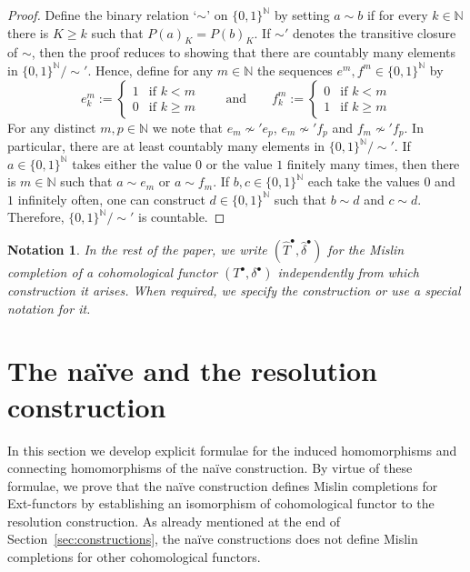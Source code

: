 \documentclass[12pt,a4paper]{article}
\numberwithin{equation}{section}
\newtheorem{notn}[thm]{Notation}
\theoremstyle{nonumberplain}
\newtheorem{proof}{Proof}
\begin{document}
\begin{proof}
Define the binary relation `$\sim$' on $\lbrace 0, 1 \rbrace^{\mathbb{N}}$ by setting $a \sim b$ if for every $k \in \mathbb{N}$ there is $K \geq k$ such that $P(a)_K = P(b)_K$. If $\sim'$ denotes the transitive closure of $\sim$, then the proof reduces to showing that there are countably many elements in $\lbrace 0, 1 \rbrace^{\mathbb{N}}/\sim'$. Hence, define for any $m \in \mathbb{N}$ the sequences $e^m, f^m \in \lbrace 0, 1 \rbrace^{\mathbb{N}}$ by
\[ e_k^m := \begin{cases} 1 &\text{if } k < m \\ 0 &\text{if } k \geq m \end{cases} \qquad \text{and} \qquad f_k^m := \begin{cases} 0 &\text{if } k < m \\ 1 &\text{if } k \geq m \end{cases} \]
For any distinct $m, p \in \mathbb{N}$ we note that $e_m \nsim' e_p$, $e_m \nsim' f_p$ and $f_m \nsim' f_p$. In particular, there are at least countably many elements in $\lbrace 0, 1 \rbrace^{\mathbb{N}}/\sim'$. If $a \in \lbrace 0, 1 \rbrace^{\mathbb{N}}$ takes either the value $0$ or the value $1$ finitely many times, then there is $m \in \mathbb{N}$ such that $a \sim e_m$ or $a \sim f_m$. If $b, c \in \lbrace 0, 1 \rbrace^{\mathbb{N}}$ each take the values $0$ and $1$ infinitely often, one can construct $d \in \lbrace 0, 1 \rbrace^{\mathbb{N}}$ such that $b \sim d$ and $c \sim d$. Therefore, $\lbrace 0, 1 \rbrace^{\mathbb{N}}/\sim'$ is countable.
\end{proof}

\begin{notn}
In the rest of the paper, we write $(\widehat{T}^{\bullet}, \widehat{\delta}^{\bullet})$ for the Mislin completion of a cohomological functor $(T^{\bullet}, \delta^{\bullet})$ independently from which construction it arises. When required, we specify the construction or use a special notation for it.
\end{notn}

\section{The naïve and the resolution construction}\label{sec:naiveconstruction}

In this section we develop explicit formulae for the induced homomorphisms and connecting homomorphisms of the naïve construction. By virtue of these formulae, we prove that the naïve construction defines Mislin completions for Ext-functors by establishing an isomorphism of cohomological functor to the resolution construction. As already mentioned at the end of Section~\ref{sec:constructions}, the naïve constructions does not define Mislin completions for other cohomological functors.
\end{document}
